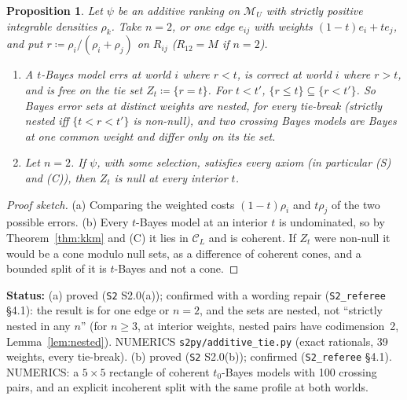 \documentclass[11pt]{article}
\newtheorem{proposition}[theorem]{Proposition}
\theoremstyle{definition}
\theoremstyle{remark}
\newcommand{\M}{\mathcal M}
\newcommand{\C}{\mathcal C}
\newcommand{\src}[1]{\texttt{#1}}
\newcommand{\status}[1]{\par\smallskip\noindent\textbf{Status:} #1\par\smallskip}
\begin{document}
\begin{proposition}\label{prop:S20}
Let $\psi$ be an additive ranking on $\M_U$ with strictly positive integrable densities $\rho_k$. Take $n=2$, or one edge $e_{ij}$ with weights $(1-t)e_i+te_j$, and put $r\coloneqq\rho_i/(\rho_i+\rho_j)$ on $R_{ij}$ ($R_{12}=M$ if $n=2$).
\begin{enumerate}[leftmargin=*,label=(\alph*)]
\item A $t$-Bayes model errs at world $i$ where $r<t$, is correct at world $i$ where $r>t$, and is free on the tie set $Z_t\coloneqq\{r=t\}$. For $t<t'$, $\{r\le t\}\subseteq\{r<t'\}$. So Bayes error sets at distinct weights are nested, for every tie-break (strictly nested iff $\{t<r<t'\}$ is non-null), and two crossing Bayes models are Bayes at one common weight and differ only on its tie set.
\item Let $n=2$. If $\psi$, with some selection, satisfies every axiom (in particular (S) and (C)), then $Z_t$ is null at every interior $t$.
\end{enumerate}
\end{proposition}
\begin{proof}[Proof sketch]
(a) Comparing the weighted costs $(1-t)\rho_i$ and $t\rho_j$ of the two possible errors. (b) Every $t$-Bayes model at an interior $t$ is undominated, so by Theorem~\ref{thm:kkm} and (C) it lies in $\C_L$ and is coherent. If $Z_t$ were non-null it would be a cone modulo null sets, as a difference of coherent cones, and a bounded split of it is $t$-Bayes and not a cone.
\end{proof}
\status{(a) proved (\src{S2} S2.0(a)); confirmed with a wording repair (\src{S2\_referee} \S4.1): the result is for one edge or $n=2$, and the sets are nested, not ``strictly nested in any $n$'' (for $n\ge3$, at interior weights, nested pairs have codimension~2, Lemma~\ref{lem:nested}). NUMERICS \src{s2py/additive\_tie.py} (exact rationals, 39 weights, every tie-break). (b) proved (\src{S2} S2.0(b)); confirmed (\src{S2\_referee} \S4.1). NUMERICS: a $5\times5$ rectangle of coherent $t_0$-Bayes models with 100 crossing pairs, and an explicit incoherent split with the same profile at both worlds.}
\end{document}
